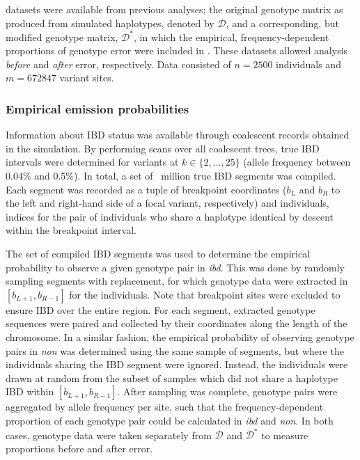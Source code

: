  datasets were available from previous analyses; the original genotype matrix as produced from simulated haplotypes, denoted by $\mathcal{D}$, and a corresponding, but modified genotype matrix, $\mathcal{D}^\ast$, in which the empirical, frequency-dependent proportions of genotype error were included in .
These datasets allowed analysis \emph{before} and \emph{after} error, respectively.
Data consisted of ${n = \num{2500}}$ individuals and ${m = \num{672847}}$ variant sites.


%
\subsubsection{Empirical emission probabilities}
%

Information about IBD status was available through coalescent records obtained in the simulation.
By performing scans over all coalescent trees, true IBD intervals were determined for \fk{} variants at ${k \in \lbrace 2, \ldots, 25 \rbrace}$ (allele frequency between 0.04\% and 0.5\%).
In total, a set of ~million true IBD segments was compiled.
Each segment was recorded as a tuple of  breakpoint coordinates ($b_L$ and $b_R$ to the left and right-hand side of a focal variant, respectively) and  individuals, \ie indices for the pair of individuals who share a haplotype identical by descent within the breakpoint interval.

The set of compiled IBD segments was used to determine the empirical probability to observe a given genotype pair in \emph{ibd}.
This was done by randomly sampling  segments with replacement, for which genotype data were extracted in ${[b_{L+1}, b_{R-1}]}$ for the  individuals.
Note that breakpoint sites were excluded to ensure IBD over the entire region.
For each segment, extracted genotype sequences were paired and collected by their coordinates along the length of the chromosome.
In a similar fashion, the empirical probability of observing genotype pairs in \emph{non} was determined using the same sample of segments, but where the  individuals sharing the IBD segment were ignored.
Instead, the  individuals were drawn at random from the subset of samples which did not share a haplotype IBD within ${[b_{L+1}, b_{R-1}]}$.
After sampling was complete, genotype pairs were aggregated by allele frequency per site, such that the frequency-dependent proportion of each genotype pair could be calculated in \emph{ibd} and \emph{non}.
In both cases, genotype data were taken separately from $\mathcal{D}$ and $\mathcal{D}^\ast$ to measure proportions before and after error.

